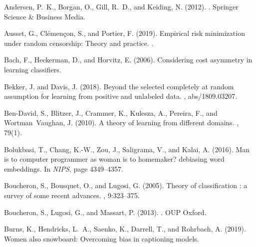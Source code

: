 \documentclass[12pt]{article}
\begin{document}
\newpage





\begin{thebibliography}{}

Andersen, P.~K., Borgan, O., Gill, R.~D., and Keiding, N. (2012).
.
\newblock Springer Science \& Business Media.

Ausset, G., Cl{\'e}men{\c{c}}on, S., and Portier, F. (2019).
\newblock Empirical risk minimization under random censorship: Theory and
  practice.
.

Bach, F., Heckerman, D., and Horvitz, E. (2006).
\newblock Considering cost asymmetry in learning classifiers.

Bekker, J. and Davis, J. (2018).
\newblock Beyond the selected completely at random assumption for learning from
  positive and unlabeled data.
, abs/1809.03207.

Ben-David, S., Blitzer, J., Crammer, K., Kulesza, A., Pereira, F., and
  Wortman~Vaughan, J. (2010).
\newblock A theory of learning from different domains.
, 79(1).

Bolukbasi, T., Chang, K.-W., Zou, J., Saligrama, V., and Kalai, A. (2016).
\newblock Man is to computer programmer as woman is to homemaker? debiasing
  word embeddings.
\newblock In {\em NIPS}, page 4349–4357.

Boucheron, S., Bousquet, O., and Lugosi, G. (2005).
\newblock Theory of classification : a survey of some recent advances.
, 9:323--375.

Boucheron, S., Lugosi, G., and Massart, P. (2013).
.
\newblock OUP Oxford.

Burns, K., Hendricks, L.~A., Saenko, K., Darrell, T., and Rohrbach, A. (2019).
\newblock Women also snowboard: Overcoming bias in captioning models.


\end{thebibliography}
\end{document}
